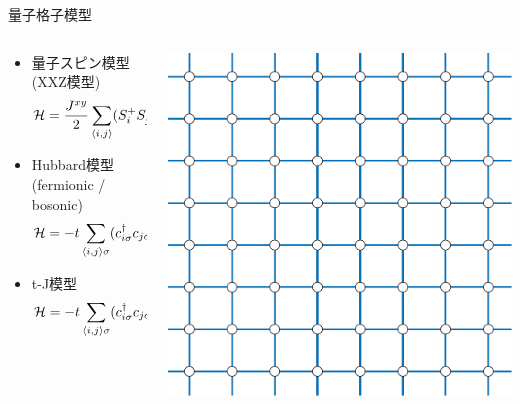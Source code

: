 \begin{frame}[fragile]{量子格子模型}
  \begin{columns}[T]
    \begin{column}{.8\textwidth}
      \begin{itemize}
        \setlength{\itemsep}{-.5em}
      \item 量子スピン模型(XXZ模型) \begin{equation*} {\cal H} = \frac{J^{xy}}{2}
        \sum_{\langle i,j \rangle} (S^+_i S^-_j + S^-_i S^+_j) + J^z
        \sum_{\langle i,j \rangle} S^z_i S^z_j \end{equation*}
      \item Hubbard模型 (fermionic / bosonic)
        \begin{equation*} {\cal H} = -t \sum_{\langle i,j \rangle \sigma}
        (c^\dagger_{i\sigma} c_{j\sigma} + \mbox{h.c.}) + U \sum_{i}
        n_{i\uparrow} n_{i\downarrow} \end{equation*}
      \item t-J模型 \begin{equation*} {\cal H} = -t \sum_{\langle i,j \rangle \sigma}
        (c^\dagger_{i\sigma} c_{j\sigma} + \mbox{h.c.}) + J \sum_{i,j}
        ({\bf S}_i \cdot {\bf S}_j - n_{i} n_{j} / 4) \end{equation*}
      \end{itemize}
    \end{column}
    \begin{column}{.2\textwidth}
      \includegraphics[width=\textwidth]{square.pdf}
    \end{column}
  \end{columns}
\end{frame}

